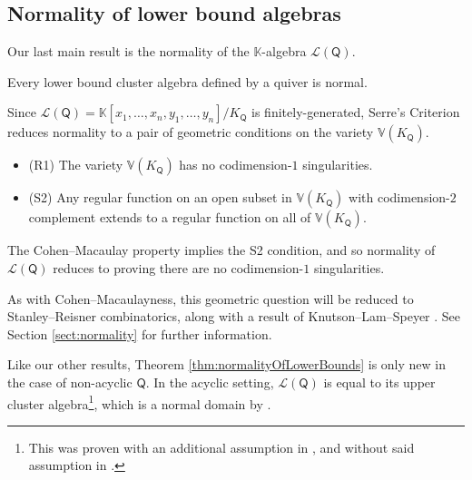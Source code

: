 \documentclass[ALCO,published]{cedram}
\numberwithin{equation}{section}
\renewcommand{\L}{\mathcal{L}}%
\newcommand{\1}{^{-1}}
\def\Q{\mathsf{Q}}
\begin{document}
\subsection{Normality of lower bound algebras}

Our last main result is the normality of the $\mathbb{K}$-algebra $\L(\Q)$.

\begin{thm}\label{thm:normalityOfLowerBounds}
Every lower bound cluster algebra defined by a quiver is normal.
\end{thm}

Since $\L(\Q)= \mathbb{K}[x_1,\dots,x_n,y_1,\dots,y_n]/K_\Q$ is finitely-generated, Serre's Criterion reduces normality to a pair of geometric conditions on the variety $\mathbb{V}(K_\Q)$.
\begin{itemize}
	\item (R1) The variety $\mathbb{V}(K_\Q)$ has no codimension\--$1$ singularities.
	\item (S2) Any regular function on an open subset in $\mathbb{V}(K_\Q)$ with codimension\--$2$ complement extends to a regular function on all of $\mathbb{V}(K_\Q)$.
\end{itemize}
The Cohen--Macaulay property implies the S2 condition, and so normality of $\L(\Q)$ reduces to proving there are no codimension\--$1$ singularities.  

As with Cohen--Macaulayness, this geometric question will be reduced to Stanley--Reisner combinatorics, along  with a result of Knutson--Lam--Speyer \cite[Proposition 8.1]{KLS-Richardson}. See Section \ref{sect:normality} for further information.

%
%

\begin{rem}
Like our other results, Theorem \ref{thm:normalityOfLowerBounds} is only new in the case of non-acyclic $\Q$. In the acyclic setting, $\L(\Q)$ is equal to its upper cluster algebra\footnote{This was proven with an additional assumption in \cite[Thm. 1.18]{BFZ05}, and without said assumption in \cite{MulAU}.},  which is a normal domain by \cite[Prop. 2.1]{MulLA}.
\end{rem}
\end{document}
